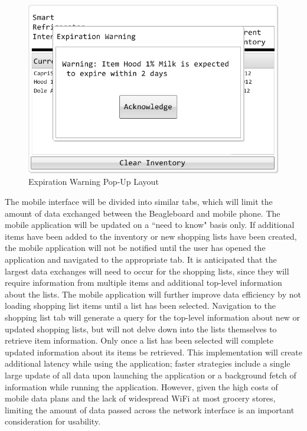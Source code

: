 \documentclass[11pt]{article} %
\begin{document}
\begin{figure}[h!]
\begin{center}
\includegraphics[scale=0.5]{MockUp4}
\caption{Expiration Warning Pop-Up Layout}
\label{mock4}
\end{center}
\end{figure}
\pagebreak
\quad \newline
The mobile interface will be divided into similar tabs, which will limit the amount of data exchanged between the Beagleboard and mobile phone. The mobile application will be updated on a ``need to know" basis only. If additional items have been added to the inventory or new shopping lists have been created, the mobile application will not be notified until the user has opened the application and navigated to the appropriate tab. It is anticipated that the largest data exchanges will need to occur for the shopping lists, since they will require information from multiple items and additional top-level information about the lists. The mobile application will further improve data efficiency by not loading shopping list items until a list has been selected. Navigation to the shopping list tab will generate a query for the top-level information about new or updated shopping lists, but will not delve down into the lists themselves to retrieve item information. Only once a list has been selected will complete updated information about its items be retrieved. This implementation will create additional latency while using the application; faster strategies include a single large update of all data upon launching the application or a background fetch of information while running the application. However, given the high costs of mobile data plans and the lack of widespread WiFi at most grocery stores, limiting the amount of data passed across the network interface is an important consideration for usability.
\end{document}
